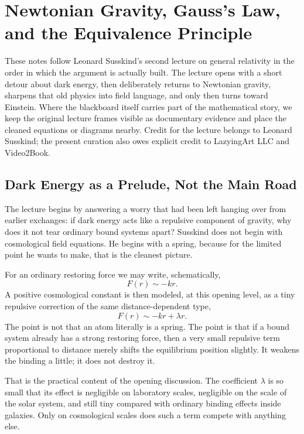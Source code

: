 \chapter{Newtonian Gravity, Gauss's Law, and the Equivalence Principle}

These notes follow Leonard Susskind's second lecture on general relativity in the order in which the argument is actually built. The lecture opens with a short detour about dark energy, then deliberately returns to Newtonian gravity, sharpens that old physics into field language, and only then turns toward Einstein. Where the blackboard itself carries part of the mathematical story, we keep the original lecture frames visible as documentary evidence and place the cleaned equations or diagrams nearby. Credit for the lecture belongs to Leonard Susskind; the present curation also owes explicit credit to LazyingArt LLC and Video2Book.

\section{Dark Energy as a Prelude, Not the Main Road}

The lecture begins by answering a worry that had been left hanging over from earlier exchanges: if dark energy acts like a repulsive component of gravity, why does it not tear ordinary bound systems apart? Susskind does not begin with cosmological field equations. He begins with a spring, because for the limited point he wants to make, that is the cleanest picture.

For an ordinary restoring force we may write, schematically,
\begin{equation}
F(r)\sim -kr.
\end{equation}
A positive cosmological constant is then modeled, at this opening level, as a tiny repulsive correction of the same distance-dependent type,
\begin{equation}
F(r)\sim -kr+\lambda r.
\end{equation}
The point is not that an atom literally is a spring. The point is that if a bound system already has a strong restoring force, then a very small repulsive term proportional to distance merely shifts the equilibrium position slightly. It weakens the binding a little; it does not destroy it.

That is the practical content of the opening discussion. The coefficient $\lambda$ is so small that its effect is negligible on laboratory scales, negligible on the scale of the solar system, and still tiny compared with ordinary binding effects inside galaxies. Only on cosmological scales does such a term compete with anything else.

